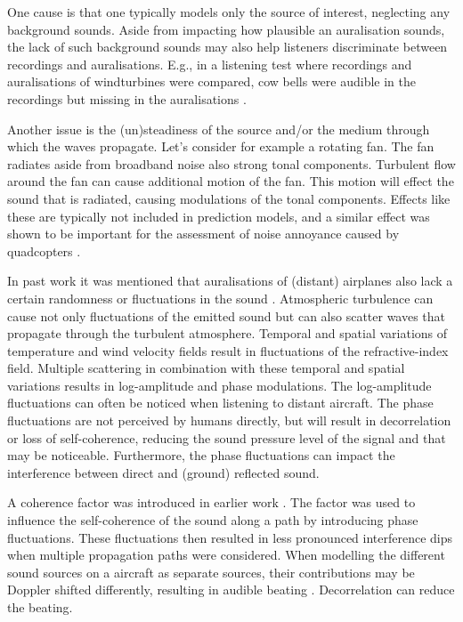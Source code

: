 One cause is that one typically models only the source of interest, neglecting
any background sounds. Aside from impacting how plausible an auralisation
sounds, the lack of such background sounds may also help listeners discriminate
between recordings and auralisations. E.g., in a listening test where recordings
and auralisations of windturbines were compared, cow bells were audible in the
recordings but missing in the auralisations \cite{Pieren2014}.

Another issue is the (un)steadiness of the source and/or
the medium through which the waves propagate. Let's consider for example a
rotating fan. The fan radiates aside from broadband noise also strong tonal
components. Turbulent flow around the fan can cause additional motion of the
fan. This motion will effect the sound that is radiated, causing
modulations of the tonal components. Effects like these are typically not
included in prediction models, and a similar effect was shown to be
important for the assessment of noise annoyance caused by quadcopters
\cite{Rizzi2015}.

In past work it was mentioned that auralisations of (distant) airplanes also
lack a certain randomness or fluctuations in the sound \cite{Arntzen2014a}.
Atmospheric turbulence can cause not only fluctuations of the emitted sound but
can also scatter waves that propagate through the turbulent atmosphere. Temporal
and spatial variations of temperature and wind velocity fields result in
fluctuations of the refractive-index field. Multiple scattering in combination
with these temporal and spatial variations results in log-amplitude and phase
modulations. The log-amplitude fluctuations can often be noticed when listening
to distant aircraft. The phase fluctuations are not perceived by humans
directly, but will result in decorrelation or loss of self-coherence, reducing
the sound pressure level of the signal and that may be noticeable. Furthermore,
the phase fluctuations can impact the interference between direct and (ground)
reflected sound.

A coherence factor was introduced in earlier work \cite{Shin2006, Arntzen2014b,
Arntzen2014a}. The factor was used to influence the self-coherence of the sound
along a path by introducing phase fluctuations. These fluctuations then resulted
in less pronounced interference dips when multiple propagation paths were
considered. When modelling the different sound sources on a aircraft as separate
sources, their contributions may be Doppler shifted differently, resulting in
audible beating \cite{Rizzi2013}. Decorrelation can reduce the beating.


